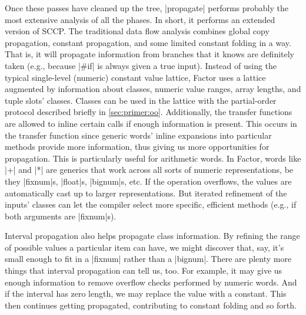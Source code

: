 Once these passes have cleaned up the tree, \factor|propagate| performs
probably the most extensive analysis of all the phases.  In short, it performs
an extended version of \gls{SCCP}.  The traditional data flow
analysis combines global copy propagation, constant propagation, and some
limited constant folding in a  way.  That is, it will
propagate information from branches that it knows are definitely taken (e.g.,
because \factor|#if| is always given a true input).  Instead of using the
typical single-level (numeric) constant value lattice, Factor uses a lattice
augmented by information about classes, numeric value ranges, array lengths,
and tuple slots' classes.  Classes can be used in the lattice with the
partial-order protocol described briefly in \cref{sec:primer:oo}.
Additionally, the transfer functions are allowed to inline certain calls if
enough information is present.  This occurs in the transfer function since
generic words' inline expansions into particular methods provide more
information, thus giving us more opportunities for propagation.  This is
particularly useful for arithmetic words.  In Factor, words like \factor|+| and
\factor|*| are generics that work across all sorts of numeric representations,
be they \factor|fixnum|s, \factor|float|s, \factor|bignum|s, etc.  If the
operation overflows, the values are automatically cast up to larger
representations.  But iterated refinement of the inputs' classes can let the
compiler select more specific, efficient methods (e.g., if both arguments are
\factor|fixnum|s).

Interval propagation also helps propagate class information.  By refining the
range of possible values a particular item can have, we might discover that,
say, it's small enough to fit in a \factor|fixnum| rather than a
\factor|bignum|.  There are plenty more things that interval propagation can
tell us, too.  For example, it may give us enough information to remove
overflow checks performed by numeric words.  And if the interval has zero
length, we may replace the value with a constant.  This then continues getting
propagated, contributing to constant folding and so forth.


